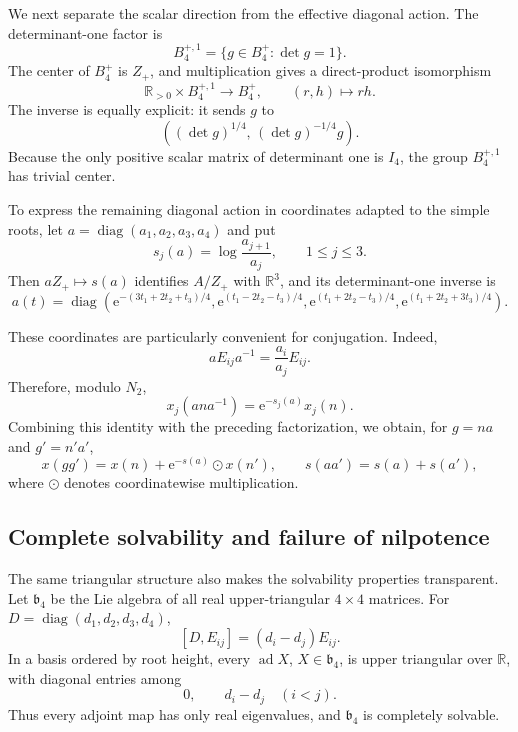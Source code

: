 \documentclass[10pt,a4paper]{amsart}
\numberwithin{equation}{section}
\newcommand{\R}{\mathbb R}
\newcommand{\ad}{\operatorname{ad}}
\newcommand{\e}{\mathrm e}
\begin{document}
We next separate the scalar direction from the effective diagonal action.
The determinant-one factor is
\[
 B_4^{+,1}=\{g\in B_4^+:\det g=1\}.
\]
The center of $B_4^+$ is $Z_+$, and multiplication gives a direct-product
isomorphism
\begin{equation}
 \R_{>0}\times B_4^{+,1}\longrightarrow B_4^+,
 \qquad
 (r,h)\longmapsto rh.
 \label{eq:B4-scalar-splitting}
\end{equation}
The inverse is equally explicit: it sends $g$ to
\[
 \left((\det g)^{1/4},\,(\det g)^{-1/4}g\right).
\]
Because the only positive scalar matrix of determinant one is $I_4$, the
group $B_4^{+,1}$ has trivial center.

To express the remaining diagonal action in coordinates adapted to the
simple roots, let $a=\operatorname{diag}(a_1,a_2,a_3,a_4)$ and put
\begin{equation}
 s_j(a)=\log\frac{a_{j+1}}{a_j},
 \qquad 1\leq j\leq3.
 \label{eq:B4-simple-root-coordinates}
\end{equation}
Then $aZ_+\mapsto s(a)$ identifies $A/Z_+$ with $\R^3$, and its
determinant-one inverse is
\begin{equation}
 a(t)=\operatorname{diag}\left(
 \e^{-(3t_1+2t_2+t_3)/4},
 \e^{(t_1-2t_2-t_3)/4},
 \e^{(t_1+2t_2-t_3)/4},
 \e^{(t_1+2t_2+3t_3)/4}
 \right).
 \label{eq:B4-diagonal-section}
\end{equation}

These coordinates are particularly convenient for conjugation.  Indeed,
\[
 aE_{ij}a^{-1}=\frac{a_i}{a_j}E_{ij}.
\]
Therefore, modulo $N_2$,
\[
 x_j(ana^{-1})=\e^{-s_j(a)}x_j(n).
\]
Combining this identity with the preceding factorization, we obtain, for
$g=na$ and $g'=n'a'$,
\begin{equation}
 x(gg')=x(n)+\e^{-s(a)}\odot x(n'),
 \qquad
 s(aa')=s(a)+s(a'),
 \label{eq:B4-effective-law}
\end{equation}
where $\odot$ denotes coordinatewise multiplication.

\subsection{Complete solvability and failure of nilpotence}

The same triangular structure also makes the solvability properties
transparent.  Let $\mathfrak b_4$ be the Lie algebra of all real
upper-triangular $4\times4$ matrices.  For
$D=\operatorname{diag}(d_1,d_2,d_3,d_4)$,
\[
 [D,E_{ij}]=(d_i-d_j)E_{ij}.
\]
In a basis ordered by root height, every $\ad X$, $X\in\mathfrak b_4$,
is upper triangular over $\R$, with diagonal entries among
\[
 0,\qquad d_i-d_j\quad (i<j).
\]
Thus every adjoint map has only real eigenvalues, and $\mathfrak b_4$ is
completely solvable.
\end{document}
